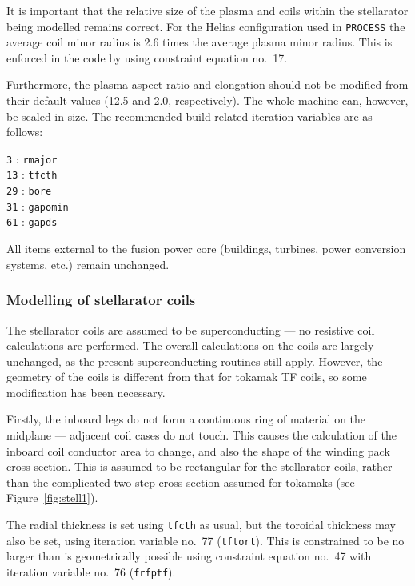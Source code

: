 \documentclass[11pt,a4paper]{report}
\newcommand{\process}{\mbox{\texttt{PROCESS}}}
\begin{document}
It is important that the relative size of the plasma and coils within the
stellarator being modelled remains correct. For the Helias configuration used
in \process\/ the average coil minor radius is 2.6 times the average plasma
minor radius. This is enforced in the code by using constraint equation no.\
17.

Furthermore, the plasma aspect ratio and elongation should not be modified
from their default values (12.5 and 2.0, respectively). The whole machine can,
however, be scaled in size. The recommended build-related iteration variables
are as follows:
\begin{tabbing}
\hspace{15mm}\= \texttt{3} : \texttt{rmajor} \\
\> \texttt{13} : \texttt{tfcth} \\
\> \texttt{29} : \texttt{bore} \\
\> \texttt{31} : \texttt{gapomin} \\
\> \texttt{61} : \texttt{gapds}
\end{tabbing}
All items external to the fusion power core (buildings, turbines, power
conversion systems, etc.) remain unchanged.

\subsubsection{Modelling of stellarator coils}

The stellarator coils are assumed to be superconducting --- no resistive coil
calculations are performed.  The overall calculations on the coils are largely
unchanged, as the present superconducting routines still apply. However, the
geometry of the coils is different from that for tokamak TF coils, so some
modification has been necessary.

Firstly, the inboard legs do not form a continuous ring of material on the
midplane --- adjacent coil cases do not touch. This causes the calculation of
the inboard coil conductor area to change, and also the shape of the winding
pack cross-section. This is assumed to be rectangular for the stellarator
coils, rather than the complicated two-step cross-section assumed for tokamaks
(see Figure~\ref{fig:stell1}).

The radial thickness is set using \texttt{tfcth} as usual, but the toroidal
thickness may also be set, using iteration variable no.\ 77
(\texttt{tftort}). This is constrained to be no larger than is geometrically
possible using constraint equation no.\ 47 with iteration variable no.\ 76
(\texttt{frfptf}).
\end{document}
